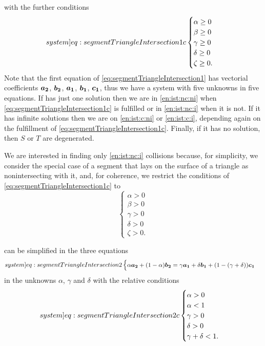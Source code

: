 \documentclass[dissertation.tex]{subfiles}
\begin{document}
with the further conditions
\begin{equation}\label[system]{eq:segmentTriangleIntersection1c}
  \begin{cases}
    \alpha \ge 0\\
    \beta \ge 0\\
    \gamma \ge 0\\
    \delta \ge 0\\
    \zeta \ge 0.
  \end{cases}
\end{equation}
Note that the first equation of
\cref{eq:segmentTriangleIntersection1} has vectorial coefficients
$\boldsymbol{a_2}$, $\boldsymbol{b_2}$, $\boldsymbol{a_1}$, $\boldsymbol{b_1}$, $\boldsymbol{c_1}$, thus we
have a system with five unknowns in five equations. If
 has just one solution then we are
in \cref{en:ist:nc:ni} when \cref{eq:segmentTriangleIntersection1c} is
fulfilled or in \cref{en:ist:nc:i} when it is not. If it has
infinite
solutions then we are on \cref{en:ist:c:ni} or \cref{en:ist:c:i},
depending again on the fulfillment of
\cref{eq:segmentTriangleIntersection1c}. Finally, if it has no
solution, then $S$ or $T$ are degenerated.

We are interested in finding only \cref{en:ist:nc:i} collisions because, for
simplicity, we consider the special case of a segment that lays on the
surface of a triangle as nonintersecting with it, and, for coherence, we
restrict the conditions of \cref{eq:segmentTriangleIntersection1c} to
\begin{equation}
  \begin{cases}
    \alpha > 0\\
    \beta > 0\\
    \gamma > 0\\
    \delta > 0\\
    \zeta > 0.
  \end{cases}
\end{equation}

 can be simplified in the three
equations 
\begin{equation}\label[system]{eq:segmentTriangleIntersection2}
  \begin{cases}
    \alpha \ve{a_2} + (1-\alpha)\ve{b_2}=\gamma\ve{a_1}+\delta\ve{b_1}+(1-(\gamma+\delta))\ve{c_1} \\
  \end{cases}
\end{equation}
in the unknowns $\alpha$, $\gamma$ and $\delta$ with the relative conditions
\begin{equation}\label[system]{eq:segmentTriangleIntersection2c}
  \begin{cases}
    \alpha > 0\\
    \alpha < 1\\
    \gamma > 0\\
    \delta > 0\\
    \gamma+\delta<1.
  \end{cases}
\end{equation}
\end{document}
